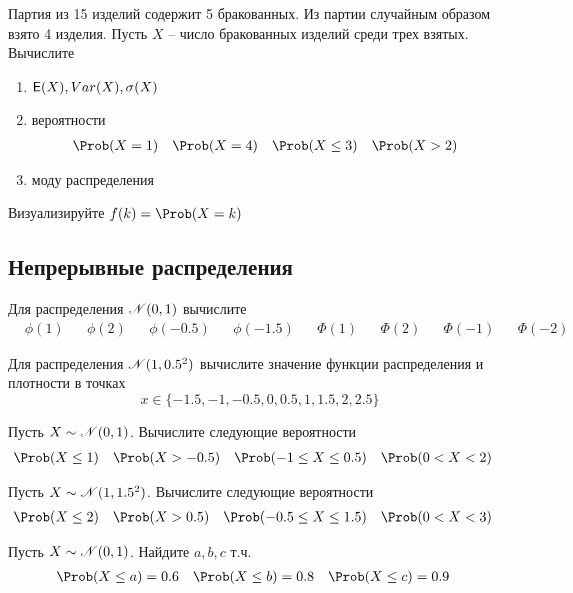 \begin{exercise}
Партия из 15 изделий содержит 5 бракованных. Из партии случайным образом взято 4 изделия. 
Пусть \(X\) -- число бракованных изделий среди трех взятых.
Вычислите
\begin{enumerate}
	\item \({\mathsf E}(X), Var(X), \sigma(X)\)
	\item вероятности
	\begin{align*}
		&\Prob(X=1) & &\Prob(X=4) & &\Prob(X\leq3) & &\Prob(X>2)
	\end{align*}
	\item моду распределения
\end{enumerate}
Визуализируйте \(f(k)=\Prob(X=k)\)
\end{exercise}

\subsection{Непрерывные распределения}

\begin{exercise}
Для распределения \({\mathscr N}(0,1)\) вычислите
\begin{align*}
	&\phi(1) & &\phi(2) & &\phi(-0.5) & &\phi(-1.5) & &\Phi(1) & &\Phi(2) & &\Phi(-1) & &\Phi(-2)
\end{align*}
\end{exercise}

\begin{exercise}
Для распределения \({\mathscr N}(1,0.5^2)\) вычислите значение функции распределения и плотности в точках
\[
	x\in\{-1.5, -1, -0.5, 0, 0.5, 1, 1.5, 2, 2.5\}
\]
\end{exercise}

\begin{exercise}
Пусть \(X\sim{\mathscr N}(0,1)\). Вычислите следующие вероятности
\begin{align*}
	&\Prob(X\leq1) & &\Prob(X>-0.5) & 
	&\Prob(-1\leq X\leq0.5) & &\Prob(0<X<2)
\end{align*}
\end{exercise}

\begin{exercise}
Пусть \(X\sim{\mathscr N}(1,1.5^2)\). Вычислите следующие вероятности
\begin{align*}
	&\Prob(X\leq2) & &\Prob(X>0.5) & 
	&\Prob(-0.5\leq X\leq1.5) & &\Prob(0<X<3)
\end{align*}
\end{exercise}

\begin{exercise}
Пусть \(X\sim{\mathscr N}(0,1)\). Найдите \(a,b,c\) т.ч.
\begin{align*}
	&\Prob(X\leq a)=0.6 & &\Prob(X\leq b)=0.8 & 
	&\Prob(X\leq c)=0.9
\end{align*}
\end{exercise}

